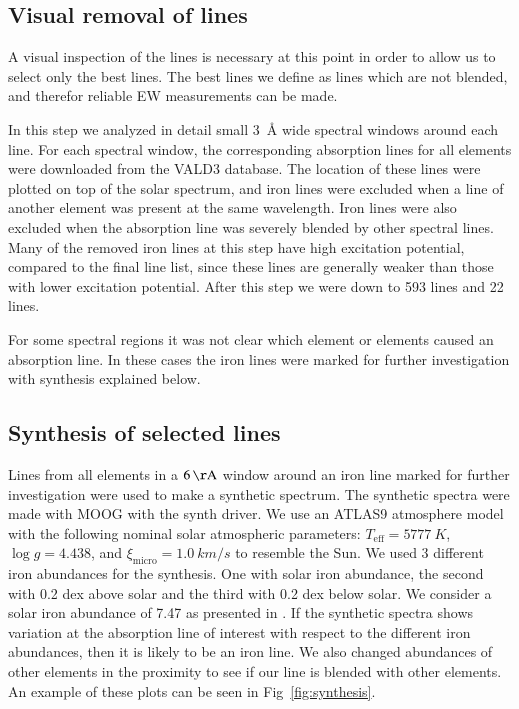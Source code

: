 \documentclass{aa}
\begin{document}
\subsection{Visual removal of lines}
\label{sub:visual_removal_of_lines}

A visual inspection of the lines is necessary at this point in order to
allow us to select only the best lines. The best lines we define as lines
which are not blended, and therefor reliable EW measurements can be made.

In this step we analyzed in detail small \SI{3}{\angstrom} wide spectral
windows around each line. For each spectral window, the corresponding
absorption lines for all elements were downloaded from the VALD3 database.
The location of these lines were plotted on top of the solar
spectrum, and iron lines were excluded when a line of another element
was present at the same wavelength. Iron lines were also excluded when
the absorption line was severely blended by other spectral lines. Many
of the removed iron lines at this step have high excitation potential,
compared to the final line list, since these lines are generally weaker
than those with lower excitation potential. After this step we were down
to 593  lines and 22  lines.

For some spectral regions it was not clear which element or elements
caused an absorption line. In these cases the iron lines were marked for
further investigation with synthesis explained below.


\subsection{Synthesis of selected lines}
\label{sub:synthesis_of_selected_lines}

Lines from all elements in a $\SI{6}{\AA}$ window around an iron line
marked for further investigation were used to make a synthetic spectrum.
The synthetic spectra were made with MOOG with the synth driver. We use
an ATLAS9 atmosphere model \citep{Kurucz1993} with
the following nominal solar atmospheric parameters: $T_\mathrm{eff}=\SI{5777}{K}$,
$\log g = 4.438$, and $\xi_\mathrm{micro} = \SI{1.0}{km/s}$ to resemble
the Sun. We used 3 different iron abundances for the synthesis. One
with solar iron abundance, the second with 0.2 dex above solar and the
third with 0.2 dex below solar. We consider a solar iron abundance
of 7.47 as presented in \cite{Gonzalez2000}. If the synthetic spectra
shows variation at the absorption line of interest with respect to the
different iron abundances, then it is likely to be an iron line. We also
changed abundances of other elements in the proximity to see if our line
is blended with other elements. An example of these plots can be seen in
Fig~\ref{fig:synthesis}.
\end{document}
